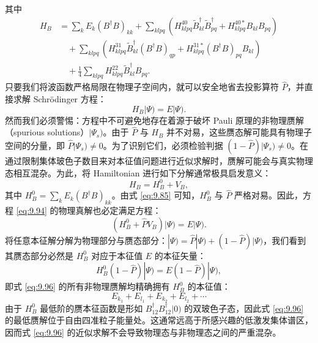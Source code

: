 其中
\begin{align}
H_{B} & =\sum_{k}E_{k}(B^{\dagger}B)_{kk}+\sum_{klpq}\left(H^{40}_{klpq}\tilde{B}^{\dagger}_{kl}\tilde{B}^{\dagger}_{pq}+H^{40*}_{klpq}B_{kl}B_{pq}\right)\nonumber \\
 & \quad+\sum_{klpq}\left(H^{31}_{klpq}\tilde{B}^{\dagger}_{kl}(B^{\dagger}B)_{qp}+H^{31*}_{klpq}(B^{\dagger}B)_{pq}B_{kl}\right)\nonumber \\
 & \quad+\frac{1}{4}\sum_{klpq}H^{22}_{klpq}\tilde{B}^{\dagger}_{kl}B_{pq}.\label{eq:9.93}
\end{align}
只要我们将波函数严格局限在物理子空间内，就可以安全地省去投影算符 $\hat{P}$，并直接求解 Schrödinger 方程：
\begin{equation}
H_{B}|\Psi)=E|\Psi).\label{eq:9.94}
\end{equation}
然而我们必须警惕：方程中不可避免地存在着源于破坏 Pauli 原理的非物理赝解（spurious solutions）$|\Psi_{s})$。由于
$\hat{P}$ 与 $H_{B}$ 并不对易，这些赝态解可能具有物理子空间的分量，即 $\hat{P}|\Psi_{s})\ne0$。为了识别它们，必须检验判据
$(1-\hat{P})|\Psi_{s})\ne0$。在通过限制集体玻色子数目来对本征值问题进行近似求解时，赝解可能会与真实物理态相互混杂。为此，将
Hamiltonian 进行如下分解通常极具启发意义：
\begin{equation}
H_{B}=H^{0}_{B}+V_{B},\label{eq:9.95}
\end{equation}
其中 $H^{0}_{B}=\sum_{k}E_{k}(B^{\dagger}B)_{kk}$。由式 \ref{eq:9.85}
可知，$H^{0}_{B}$ 与 $\hat{P}$ 严格对易。因此，方程 \ref{eq:9.94} 的物理真解也必定满足方程：
\begin{equation}
\left(H^{0}_{B}+\hat{P}V_{B}\right)|\Psi)=E|\Psi).\label{eq:9.96}
\end{equation}
将任意本征解分解为物理部分与赝态部分：$|\Psi)=\hat{P}|\Psi)+(1-\hat{P})|\Psi)$，我们看到其赝态部分必然是
$H^{0}_{B}$ 对应于本征值 $E$ 的本征矢量：
\begin{equation}
H^{0}_{B}(1-\hat{P})|\Psi)=E(1-\hat{P})|\Psi),\label{eq:9.97}
\end{equation}
即式 \ref{eq:9.96} 的所有非物理赝解均精确拥有 $H^{0}_{B}$ 的本征值：
\begin{equation}
E_{k_{1}}+E_{l_{1}}+E_{k_{2}}+E_{l_{2}}+\cdots\label{eq:9.98}
\end{equation}
由于 $H^{0}_{B}$ 最低阶的赝本征函数是形如 $B^{\dagger}_{12}B^{\dagger}_{12}|0)$
的双玻色子态，因此式 \ref{eq:9.96} 的最低赝解位于自由四准粒子能量处。这通常远高于所感兴趣的低激发集体谱区，因而式
\ref{eq:9.96} 的近似求解不会导致物理态与非物理态之间的严重混杂。

